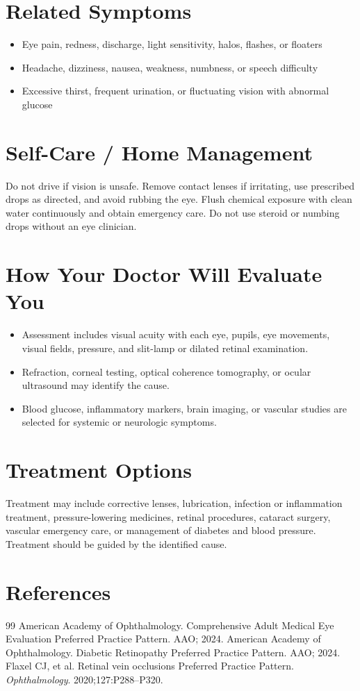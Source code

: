 \section*{Related Symptoms}
\begin{itemize}
  \item Eye pain, redness, discharge, light sensitivity, halos, flashes, or floaters
  \item Headache, dizziness, nausea, weakness, numbness, or speech difficulty
  \item Excessive thirst, frequent urination, or fluctuating vision with abnormal glucose
\end{itemize}

\section*{Self-Care / Home Management}
Do not drive if vision is unsafe. Remove contact lenses if irritating, use prescribed drops as directed, and avoid rubbing the eye. Flush chemical exposure with clean water continuously and obtain emergency care. Do not use steroid or numbing drops without an eye clinician.

\section*{How Your Doctor Will Evaluate You}
\begin{itemize}
  \item Assessment includes visual acuity with each eye, pupils, eye movements, visual fields, pressure, and slit-lamp or dilated retinal examination.
  \item Refraction, corneal testing, optical coherence tomography, or ocular ultrasound may identify the cause.
  \item Blood glucose, inflammatory markers, brain imaging, or vascular studies are selected for systemic or neurologic symptoms.
\end{itemize}

\section*{Treatment Options}
Treatment may include corrective lenses, lubrication, infection or inflammation treatment, pressure-lowering medicines, retinal procedures, cataract surgery, vascular emergency care, or management of diabetes and blood pressure. Treatment should be guided by the identified cause.

\section*{References}
\begin{thebibliography}{99}
 American Academy of Ophthalmology. Comprehensive Adult Medical Eye Evaluation Preferred Practice Pattern. AAO; 2024.
 American Academy of Ophthalmology. Diabetic Retinopathy Preferred Practice Pattern. AAO; 2024.
 Flaxel CJ, et al. Retinal vein occlusions Preferred Practice Pattern. \textit{Ophthalmology}. 2020;127:P288--P320.
\end{thebibliography}
